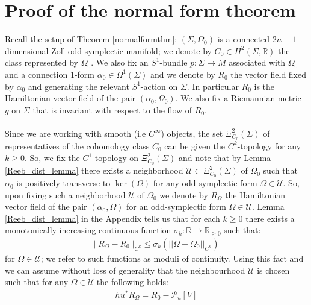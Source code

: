 \documentclass[11pt]{amsart}
\theoremstyle{plain}
\theoremstyle{definition}
\theoremstyle{remark}
\begin{document}
\section{Proof of the normal form theorem}\label{normal_form_section}
Recall the setup of Theorem \ref{normalformthm}: $(\Sigma,\Omega_0)$ is a connected $2n-1$-dimensional Zoll odd-symplectic manifold; we denote by $C_0 \in H^2(\Sigma,\mathbb{R})$ the class represented by $\Omega_0$. We also fix an $S^1$-bundle $p: \Sigma \rightarrow M$ associated with $\Omega_0$ and a connection $1$-form $\alpha_0 \in \Omega^1(\Sigma)$ and we denote by $R_0$ the vector field fixed by $\alpha_0$ and generating the relevant $S^1$-action on $\Sigma$. In particular $R_0$ is the Hamiltonian vector field of the pair $(\alpha_0,\Omega_0)$. We also fix a Riemannian metric $g$ on $\Sigma$ that is invariant with respect to the flow of $R_0$.\\
\\
Since we are working with smooth (i.e $C^{\infty}$) objects, the set $\Xi^2_{C_0}(\Sigma)$ of representatives of the cohomology class $C_0$ can be given the $C^k$-topology for any $k \geq 0$. So, we fix the $C^1$-topology on $\Xi^2_{C_0}(\Sigma)$ and note that by Lemma \ref{Reeb_dist_lemma} there exists a neighborhood $\mathcal{U} \subset \Xi^2_{C_0}(\Sigma)$ of $\Omega_0$ such that $\alpha_0$ is positively transverse to $\ker(\Omega)$ for any odd-symplectic form $\Omega \in \mathcal{U}$. So, upon fixing such a neighborhood $\mathcal{U}$ of $\Omega_0$ we denote by $R_{\Omega}$ the Hamiltonian vector field of the pair $(\alpha_0,\Omega)$ for an odd-symplectic form $\Omega \in \mathcal{U}$. Lemma \ref{Reeb_dist_lemma} in the Appendix tells us that for each $k \geq 0$ there exists a monotonically increasing continuous function $\sigma_k: \mathbb{R} \rightarrow \mathbb{R}_{\geq 0}$ such that:
\begin{align}
    ||R_{\Omega} - R_0||_{C^k} \leq \sigma_{k}(||\Omega - \Omega_0||_{C^{k}})
\end{align}
for $\Omega \in \mathcal{U}$; we refer to such functions as moduli of continuity.  Using this fact and \cite[Theorem 2.1]{Abbondandolo-Benedetti} we can assume without loss of generality that the neighbourhood $\mathcal{U}$ is chosen such that for any $\Omega \in \mathcal{U}$ the following holds:
\begin{align}\label{bottkol_decomp_for_reeb}
     hu^*R_{\Omega} = R_{0} - \mathcal{P}_{u}[V]
\end{align}
\end{document}
